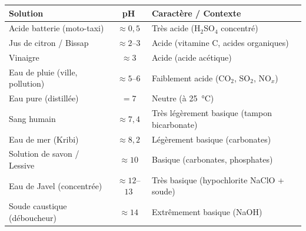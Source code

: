 \documentclass[11pt]{article}
\begin{document}
\begin{exemplebox}
\begin{center}
\begin{tabularx}{\linewidth}{|l|c|X|}\hline
\rowcolor{popblueL} \textbf{Solution} & \textbf{pH} & \textbf{Caractère / Contexte} \\ \hline
Acide batterie (moto-taxi) & $\approx 0,5$ & Très acide (H$_2$SO$_4$ concentré) \\ \hline
Jus de citron / Bissap & $\approx 2$--$3$ & Acide (vitamine C, acides organiques) \\ \hline
Vinaigre & $\approx 3$ & Acide (acide acétique) \\ \hline
Eau de pluie (ville, pollution) & $\approx 5$--$6$ & Faiblement acide (CO$_2$, SO$_2$, NO$_x$) \\ \hline
Eau pure (distillée) & $= 7$ & Neutre (à \SI{25}{\celsius}) \\ \hline
Sang humain & $\approx 7,4$ & Très légèrement basique (tampon bicarbonate) \\ \hline
Eau de mer (Kribi) & $\approx 8,2$ & Légèrement basique (carbonates) \\ \hline
Solution de savon / Lessive & $\approx 10$ & Basique (carbonates, phosphates) \\ \hline
Eau de Javel (concentrée) & $\approx 12$--$13$ & Très basique (hypochlorite NaClO + soude) \\ \hline
Soude caustique (déboucheur) & $\approx 14$ & Extrêmement basique (NaOH) \\ \hline
\end{tabularx}
\end{center}
\end{exemplebox}
\end{document}
